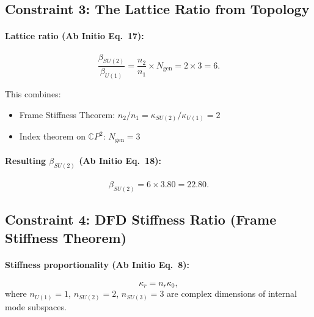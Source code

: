 \documentclass[11pt]{article}
\begin{document}
\subsection{Constraint 3: The Lattice Ratio from Topology}

\paragraph{Lattice ratio (Ab Initio Eq.~17):}
\begin{equation}\tag{LR-1}
\boxed{\frac{\beta_{SU(2)}}{\beta_{U(1)}} = \frac{n_2}{n_1} \times N_{\mathrm{gen}} = 2 \times 3 = 6.}
\end{equation}

This combines:
\begin{itemize}
\item Frame Stiffness Theorem: $n_2/n_1 = \kappa_{SU(2)}/\kappa_{U(1)} = 2$
\item Index theorem on $\mathbb{C}P^2$: $N_{\mathrm{gen}} = 3$
\end{itemize}

\paragraph{Resulting $\beta_{SU(2)}$ (Ab Initio Eq.~18):}
\begin{equation}\tag{LR-2}
\beta_{SU(2)} = 6 \times 3.80 = 22.80.
\end{equation}

\subsection{Constraint 4: DFD Stiffness Ratio (Frame Stiffness Theorem)}

\paragraph{Stiffness proportionality (Ab Initio Eq.~8):}
\begin{equation}\tag{FST-1}
\kappa_r = n_r \kappa_0,
\end{equation}
where $n_{U(1)} = 1$, $n_{SU(2)} = 2$, $n_{SU(3)} = 3$ are complex dimensions of internal mode subspaces.
\end{document}
